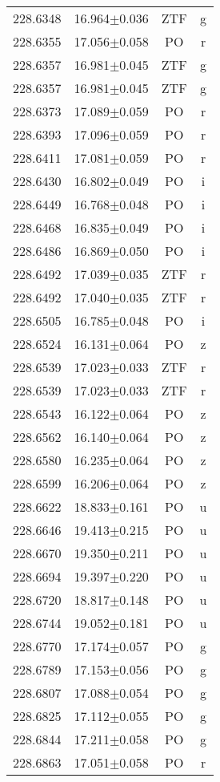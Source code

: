 \begin{table}
\begin{tabular}{cccc}
228.6348 & 16.964$\pm$0.036 & ZTF & g \\
228.6355 & 17.056$\pm$0.058 & PO & r \\
228.6357 & 16.981$\pm$0.045 & ZTF & g \\
228.6357 & 16.981$\pm$0.045 & ZTF & g \\
228.6373 & 17.089$\pm$0.059 & PO & r \\
228.6393 & 17.096$\pm$0.059 & PO & r \\
228.6411 & 17.081$\pm$0.059 & PO & r \\
228.6430 & 16.802$\pm$0.049 & PO & i \\
228.6449 & 16.768$\pm$0.048 & PO & i \\
228.6468 & 16.835$\pm$0.049 & PO & i \\
228.6486 & 16.869$\pm$0.050 & PO & i \\
228.6492 & 17.039$\pm$0.035 & ZTF & r \\
228.6492 & 17.040$\pm$0.035 & ZTF & r \\
228.6505 & 16.785$\pm$0.048 & PO & i \\
228.6524 & 16.131$\pm$0.064 & PO & z \\
228.6539 & 17.023$\pm$0.033 & ZTF & r \\
228.6539 & 17.023$\pm$0.033 & ZTF & r \\
228.6543 & 16.122$\pm$0.064 & PO & z \\
228.6562 & 16.140$\pm$0.064 & PO & z \\
228.6580 & 16.235$\pm$0.064 & PO & z \\
228.6599 & 16.206$\pm$0.064 & PO & z \\
228.6622 & 18.833$\pm$0.161 & PO & u \\
228.6646 & 19.413$\pm$0.215 & PO & u \\
228.6670 & 19.350$\pm$0.211 & PO & u \\
228.6694 & 19.397$\pm$0.220 & PO & u \\
228.6720 & 18.817$\pm$0.148 & PO & u \\
228.6744 & 19.052$\pm$0.181 & PO & u \\
228.6770 & 17.174$\pm$0.057 & PO & g \\
228.6789 & 17.153$\pm$0.056 & PO & g \\
228.6807 & 17.088$\pm$0.054 & PO & g \\
228.6825 & 17.112$\pm$0.055 & PO & g \\
228.6844 & 17.211$\pm$0.058 & PO & g \\
228.6863 & 17.051$\pm$0.058 & PO & r \\

\end{tabular}
\end{table}
